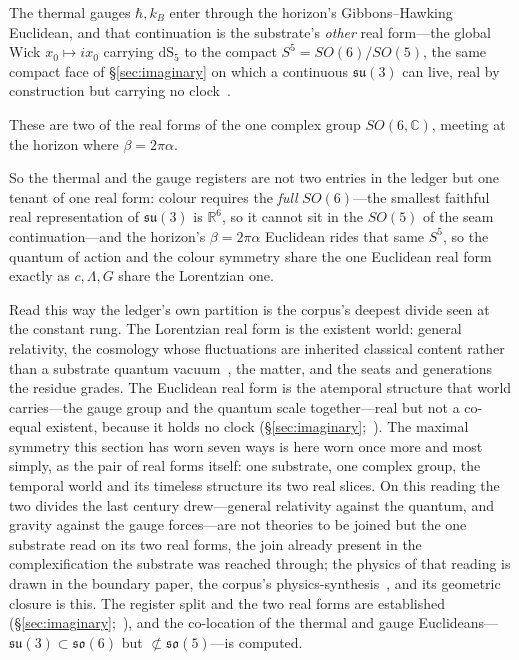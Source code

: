 \documentclass[11pt,a4paper]{article}
\theoremstyle{definition}
\begin{document}
The thermal gauges $\hbar,k_B$ enter through the horizon's Gibbons--Hawking Euclidean, and that continuation is the substrate's \emph{other} real form---the global Wick $x_0\mapsto ix_0$ carrying $\mathrm{dS}_5$ to the compact $S^5=SO(6)/SO(5)$, the same compact face of \S\ref{sec:imaginary} on which a continuous $\mathfrak{su}(3)$ can live, real by construction but carrying no clock~\cite{JanzenBoundary}. 

These are two of the real forms of the one complex group $SO(6,\mathbb{C})$, meeting at the horizon where $\beta=2\pi\alpha$. 

So the thermal and the gauge registers are not two entries in the ledger but one tenant of one real form: colour requires the \emph{full} $SO(6)$---the smallest faithful real representation of $\mathfrak{su}(3)$ is $\mathbb{R}^6$, so it cannot sit in the $SO(5)$ of the seam continuation---and the horizon's $\beta=2\pi\alpha$ Euclidean rides that same $S^5$, so the quantum of action and the colour symmetry share the one Euclidean real form exactly as $c,\Lambda,G$ share the Lorentzian one. 

Read this way the ledger's own partition is the corpus's deepest divide seen at the constant rung. The Lorentzian real form is the existent world: general relativity, the cosmology whose fluctuations are inherited classical content rather than a substrate quantum vacuum~\cite{JanzenCRcosmology}, the matter, and the seats and generations the residue grades. The Euclidean real form is the atemporal structure that world carries---the gauge group and the quantum scale together---real but not a co-equal existent, because it holds no clock (\S\ref{sec:imaginary};~\cite{JanzenCanonicalTime}). The maximal symmetry this section has worn seven ways is here worn once more and most simply, as the pair of real forms itself: one substrate, one complex group, the temporal world and its timeless structure its two real slices. On this reading the two divides the last century drew---general relativity against the quantum, and gravity against the gauge forces---are not theories to be joined but the one substrate read on its two real forms, the join already present in the complexification the substrate was reached through; the physics of that reading is drawn in the boundary paper, the corpus's physics-synthesis~\cite{JanzenBoundary}, and its geometric closure is this. The register split and the two real forms are established
(\S\ref{sec:imaginary};~\cite{JanzenBoundary,JanzenAlgebroid,JanzenCanonicalTime}), and the co-location of
the thermal and gauge Euclideans---$\mathfrak{su}(3)\subset\mathfrak{so}(6)$ but
$\not\subset\mathfrak{so}(5)$---is computed.
\end{document}
